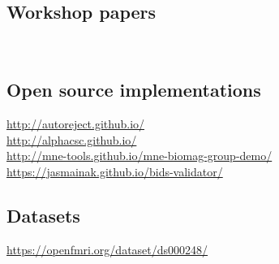 \subsection*{Workshop papers}
\

\subsection*{Open source implementations}

\url{http://autoreject.github.io/} \\
\url{http://alphacsc.github.io/} \\
\url{http://mne-tools.github.io/mne-biomag-group-demo/}\\
\url{https://jasmainak.github.io/bids-validator/}

\subsection*{Datasets}

\url{https://openfmri.org/dataset/ds000248/}
